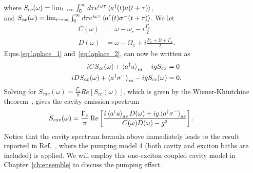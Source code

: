 where $S_{cc}(\omega) = \lim_{t\rightarrow \infty}\int_0^\infty d\tau e^{i\omega \tau}\mathinner{\langle{a^{\dagger}(t) a(t+\tau)}\rangle}$,\\ and $S_{cx}(\omega) = \lim_{t\rightarrow \infty} \int_0^\infty d\tau e^{i\omega \tau}\mathinner{\langle{a^{\dagger}(t)\sigma^-(t+\tau)}\rangle}$. We let
\begin{align} C(\omega)&= \omega-\omega_c-i\frac{\Gamma_c}{2}\label{eq:c(w)}\\ D(\omega)&=\omega-\Omega_{x}+i\frac{P_x+B+\Gamma^{\prime}_{x}}{2}.\label{eq:d(w)}
\end{align}
Equs.\eqref{eq:laplace_1} and~\eqref{eq:laplace_2}, can now be written as
\begin{align}
 iC S_{cc}(\omega)+\mathinner{\langle{a^{\dagger}a}\rangle}_{ss}-ig S_{cx}&=0\\
 iD S_{cx}(\omega)+\mathinner{\langle{a^{\dagger}\sigma^{-}}\rangle}_{ss}-ig S_{cc}(\omega)&=0.
\end{align}
Solving for $S_{cav}(\omega)=\frac{\Gamma_c}{\pi}Re[S_{cc}(\omega)]$, which is given by the Wiener-Khintchine theorem~\cite{Valle2011,yao2010nonlinear}, gives the cavity emission spectrum
\begin{eqnarray}
\!\!\!\!\!\!\!\!\!S_{cav}(\omega)=\frac{\Gamma_c}{\pi}\, {\rm Re} \left [ \frac{i\ave{a^\dagger a}_{ss}D(\omega)+ig\ave{a^\dagger\sigma^-}_{ss}}{C(\omega)D(\omega)-g^2} \right ] . \label{S_ME}
\end{eqnarray}
Notice that the cavity spectrum formula above immediately leads to the result reported in Ref.~\cite{yao2010nonlinear}, where the pumping model 4 (both cavity and exciton baths are included) is applied.
We will employ this one-exciton coupled cavity model in Chapter~\ref{ch:ensemble} to discuss the pumping effect.




